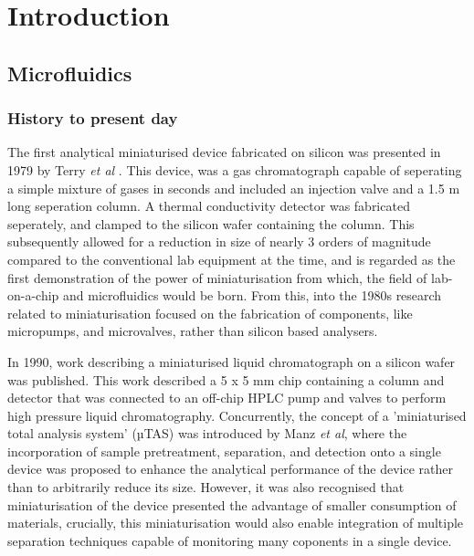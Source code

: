 
\chapter{Introduction}

\section{Microfluidics}

\subsection{History to present day}

The first analytical miniaturised device fabricated on silicon was presented in 1979 by Terry \textit{et al}
\citep{terry1979ieee}. This device, was a gas chromatograph capable of seperating a simple mixture of gases
in seconds and included an injection valve and a 1.5 m long seperation column. A thermal conductivity detector
was fabricated seperately, and clamped to the silicon wafer containing the column. This subsequently allowed for
a reduction in size of nearly 3 orders of magnitude compared to the conventional lab equipment at the time,
and is regarded\citep{reyes2002micro} as the first demonstration of the power of miniaturisation from which, the
field of lab-on-a-chip and microfluidics would be born.
From this, into the 1980s research related to miniaturisation focused on the fabrication of
components, like micropumps\citep{van1988piezoelectric,van1989thermo}, and microvalves\citep{shoji1988prototype},
rather than silicon based analysers.

In 1990, work describing a miniaturised liquid chromatograph on a silicon
wafer was published\citep{manz1990design}. This work described a 5 x 5 mm chip containing a
column and detector that was connected to an off-chip HPLC pump and valves to perform high pressure
liquid chromatography. Concurrently, the concept of a 'miniaturised total analysis system' (µTAS) was introduced
by Manz \textit{et al}\citep{manz1990miniaturized}, where the incorporation of sample pretreatment, separation,
and detection onto a single device was proposed to enhance the analytical performance of the device rather
than to arbitrarily reduce its size. However, it was also recognised that miniaturisation of the device
presented the advantage of smaller consumption of materials, crucially, this miniaturisation would also
enable integration of multiple separation techniques capable of monitoring many coponents in a single device.

